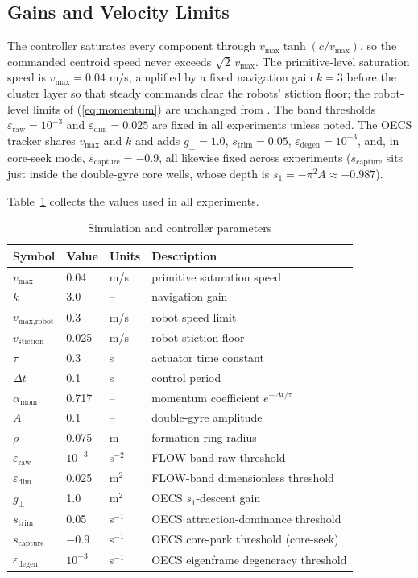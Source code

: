 \documentclass[lettersize,journal]{IEEEtran}
\begin{document}
\subsection{Gains and Velocity Limits}

The controller saturates every component through $v_{\max}\tanh(c /
v_{\max})$, so the commanded centroid speed never exceeds
$\sqrt{2}\,v_{\max}$. The primitive-level saturation speed is $v_{\max}
= 0.04$ m/s, amplified by a fixed navigation gain $k = 3$ before the
cluster layer so that steady commands clear the robots' stiction floor;
the robot-level limits of (\ref{eq:momentum}) are unchanged from \cite{14}.
The band thresholds $\varepsilon_{\text{raw}} = 10^{-3}$ and
$\varepsilon_{\text{dim}} = 0.025$ are fixed in all experiments unless
noted. The OECS tracker shares $v_{\max}$ and $k$ and adds $g_\perp =
1.0$, $s_{\text{trim}} = 0.05$, $\varepsilon_{\text{degen}} = 10^{-3}$,
and, in core-seek mode, $s_{\text{capture}} = -0.9$, all likewise fixed
across experiments ($s_{\text{capture}}$ sits just inside the
double-gyre core wells, whose depth is $s_1 = -\pi^2 A \approx
-0.987$).

Table~\ref{tab:params} collects the values used in all experiments.

\begin{table}[!t]
\centering
\caption{Simulation and controller parameters}
\label{tab:params}
\footnotesize
\setlength{\tabcolsep}{4pt}
\begin{tabular}{llll}
\hline
\textbf{Symbol} & \textbf{Value} & \textbf{Units} & \textbf{Description} \\
\hline
$v_{\max}$ & 0.04 & m/s & primitive saturation speed \\
$k$ & 3.0 & -- & navigation gain \\
$v_{\text{max,robot}}$ & 0.3 & m/s & robot speed limit \\
$v_{\text{stiction}}$ & 0.025 & m/s & robot stiction floor \\
$\tau$ & 0.3 & s & actuator time constant \\
$\Delta t$ & 0.1 & s & control period \\
$\alpha_{\text{mom}}$ & 0.717 & -- & momentum coefficient $e^{-\Delta t/\tau}$ \\
$A$ & 0.1 & -- & double-gyre amplitude \\
$\rho$ & 0.075 & m & formation ring radius \\
$\varepsilon_{\text{raw}}$ & $10^{-3}$ & s$^{-2}$ & FLOW-band raw threshold \\
$\varepsilon_{\text{dim}}$ & 0.025 & m$^{2}$ & FLOW-band dimensionless threshold \\
$g_\perp$ & 1.0 & m$^{2}$ & OECS $s_1$-descent gain \\
$s_{\text{trim}}$ & 0.05 & s$^{-1}$ & OECS attraction-dominance threshold \\
$s_{\text{capture}}$ & $-0.9$ & s$^{-1}$ & OECS core-park threshold (core-seek) \\
$\varepsilon_{\text{degen}}$ & $10^{-3}$ & s$^{-1}$ & OECS eigenframe degeneracy threshold \\
\hline
\end{tabular}
\end{table}
\end{document}

